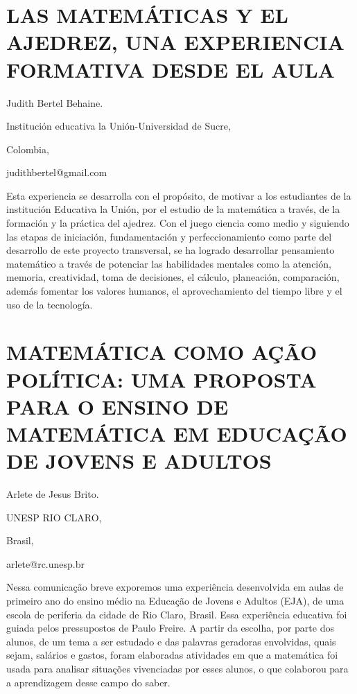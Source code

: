 \section{LAS MATEMÁTICAS Y EL AJEDREZ, UNA EXPERIENCIA FORMATIVA DESDE EL
AULA}

\begin{datos}

Judith Bertel Behaine.

Institución educativa la Unión-Universidad de Sucre,

Colombia,

judithbertel@gmail.com

\end{datos}

Esta experiencia se desarrolla con el propósito, de motivar a los
estudiantes de la institución Educativa la Unión, por el estudio de
la matemática a través, de la formación y la práctica del ajedrez.
Con el juego ciencia como medio y siguiendo las etapas de iniciación,
fundamentación y perfeccionamiento como parte del desarrollo de este
proyecto transversal, se ha logrado desarrollar pensamiento matemático
a través de potenciar las habilidades mentales como la atención, memoria,
creatividad, toma de decisiones, el cálculo, planeación, comparación,
además fomentar los valores humanos, el aprovechamiento del tiempo
libre y el uso de la tecnología.


\section{MATEMÁTICA COMO AÇÃO POLÍTICA: UMA PROPOSTA PARA O ENSINO DE MATEMÁTICA
EM EDUCAÇÃO DE JOVENS E ADULTOS }

\begin{datos}

Arlete de Jesus Brito.

UNESP RIO CLARO, 

Brasil,

arlete@rc.unesp.br

\end{datos}

Nessa comunicação breve exporemos uma experiência desenvolvida em
aulas de primeiro ano do ensino médio na Educação de Jovens e Adultos
(EJA), de uma escola de periferia da cidade de Rio Claro, Brasil.
Essa experiência educativa foi guiada pelos pressupostos de Paulo
Freire. A partir da escolha, por parte dos alunos, de um tema a ser
estudado e das palavras geradoras envolvidas, quais sejam, salários
e gastos, foram elaboradas atividades em que a matemática foi usada
para analisar situações vivenciadas por esses alunos, o que colaborou
para a aprendizagem desse campo do saber.



